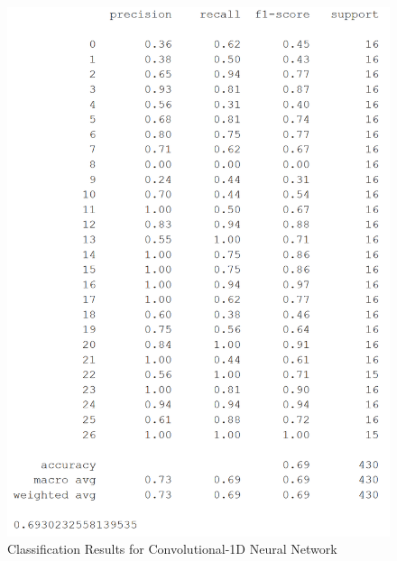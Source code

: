 \documentclass[conference]{IEEEtran}
\begin{document}
\begin{figure}[H]
\begin{center}
\includegraphics[scale=0.55]{Image/cnn1d_27_class_report.png}
\caption{\label{cnn1d_27_class_report} Classification Results for Convolutional-1D Neural Network}
\end{center}
\end{figure}
\end{document}
